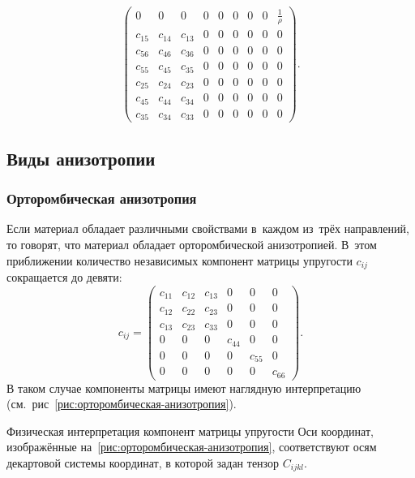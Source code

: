 \documentclass[thesis.tex]{subfiles}
\begin{document}
\begin{small}
\begin{equation}
\begin{pmatrix}
    0 & 0 & 0 & 0 & 0 & 0 & 0 & 0 & \frac 1 \rho \\
    c_{15} & c_{14} & c_{13} & 0 & 0 & 0 & 0 & 0 & 0 \\
    c_{56} & c_{46} & c_{36} & 0 & 0 & 0 & 0 & 0 & 0 \\
    c_{55} & c_{45} & c_{35} & 0 & 0 & 0 & 0 & 0 & 0 \\
    c_{25} & c_{24} & c_{23} & 0 & 0 & 0 & 0 & 0 & 0 \\
    c_{45} & c_{44} & c_{34} & 0 & 0 & 0 & 0 & 0 & 0 \\
    c_{35} & c_{34} & c_{33} & 0 & 0 & 0 & 0 & 0 & 0
    \end{pmatrix}.
\end{equation}
\end{small}


\subsection{Виды анизотропии}

\subsubsection{Орторомбическая анизотропия}
\label{раздел:орторомбическая-анизотропия}

Если материал обладает различными свойствами в~каждом из~трёх направлений, то говорят, что материал обладает
орторомбической анизотропией. В~этом приближении количество независимых компонент матрицы упругости $c_{ij}$ сокращается
до девяти:
\[
    c_{ij} = \begin{pmatrix}
    c_{11} & c_{12} & c_{13} & 0 & 0 & 0 \\
    c_{12} & c_{22} & c_{23} & 0 & 0 & 0 \\
    c_{13} & c_{23} & c_{33} & 0 & 0 & 0 \\
    0 & 0 & 0 & c_{44} & 0 & 0 \\
    0 & 0 & 0 & 0 & c_{55} & 0 \\
    0 & 0 & 0 & 0 & 0 & c_{66}
    \end{pmatrix}.
\]
В таком случае компоненты матрицы имеют наглядную интерпретацию \cite{фаворская2011постановка} (см.~рис~\ref{рис:орторомбическая-анизотропия}).

    {Физическая интерпретация компонент матрицы упругости}
Оси координат, изображённые на~\ref{рис:орторомбическая-анизотропия}, соответствуют осям декартовой системы координат, в
которой задан тензор $C_{ijkl}$.
\end{document}
